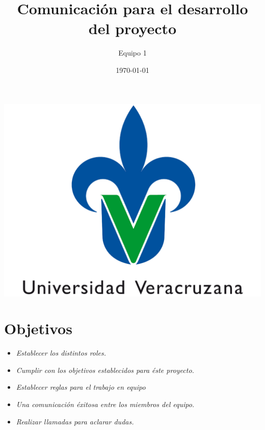 \documentclass[14pt,a4paper]{article}
\date{\today}
\begin{document}
\title{Comunicación para el desarrollo del proyecto}

\includegraphics[scale=0.4]{uv1.png} 
\author{Equipo 1}


\section{Objetivos}
\begin{itemize}
\item \textit{Establecer los distintos roles.}
\item \textit{Cumplir con los objetivos establecidos para éste proyecto.}
\item \textit{Establecer reglas para el trabajo en equipo}
\item \textit{Una comunicación éxitosa entre los miembros del equipo.}
\item \textit{Realizar llamadas para aclarar dudas.}
\end{itemize}
\vspace{0.7 cm} 
\end{document}
